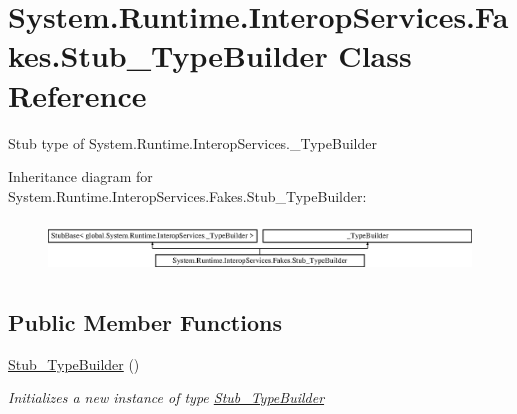 \hypertarget{class_system_1_1_runtime_1_1_interop_services_1_1_fakes_1_1_stub___type_builder}{\section{System.\-Runtime.\-Interop\-Services.\-Fakes.\-Stub\-\_\-\-Type\-Builder Class Reference}
\label{class_system_1_1_runtime_1_1_interop_services_1_1_fakes_1_1_stub___type_builder}
}


Stub type of System.\-Runtime.\-Interop\-Services.\-\_\-\-Type\-Builder 


Inheritance diagram for System.\-Runtime.\-Interop\-Services.\-Fakes.\-Stub\-\_\-\-Type\-Builder\-:\begin{figure}[H]
\begin{center}
\leavevmode
\includegraphics[height=1.417722cm]{class_system_1_1_runtime_1_1_interop_services_1_1_fakes_1_1_stub___type_builder}
\end{center}
\end{figure}
\subsection*{Public Member Functions}
\begin{DoxyCompactItemize}
\item 
\hyperlink{class_system_1_1_runtime_1_1_interop_services_1_1_fakes_1_1_stub___type_builder_a9fd14248dfda54f7095db9586bc55737}{Stub\-\_\-\-Type\-Builder} ()
\begin{DoxyCompactList}\small\item\em Initializes a new instance of type \hyperlink{class_system_1_1_runtime_1_1_interop_services_1_1_fakes_1_1_stub___type_builder}{Stub\-\_\-\-Type\-Builder}\end{DoxyCompactList}\end{DoxyCompactItemize}
